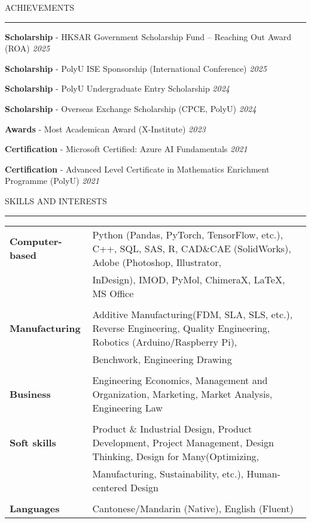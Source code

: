 \documentclass{resume} %
\renewenvironment{rSection}[1]{
\sectionskip
\textcolor{TsinghuaPurple}{\MakeUppercase{#1}}
\sectionlineskip
\hrule
\begin{list}{}{
\setlength{\leftmargin}{0em}
}
\item[]
}{
\end{list}
}
\begin{document}
\begin{rSection}{Achievements}
{\textbf{Scholarship} - HKSAR Government Scholarship Fund -- Reaching Out Award (ROA)} \hfill \textit{2025}

{\textbf{Scholarship} - PolyU ISE Sponsorship (International Conference)} \hfill \textit{2025}

{\textbf{Scholarship} - PolyU Undergraduate Entry Scholarship} \hfill \textit{2024}

{\textbf{Scholarship} - Overseas Exchange Scholarship (CPCE, PolyU)} \hfill \textit{2024}

{\textbf{Awards} - Most Academican Award (X-Institute)} \hfill \textit{2023}

{\textbf{Certification} - Microsoft Certified: Azure AI Fundamentals} \hfill \textit{2021}

{\textbf{Certification} - Advanced Level Certificate in Mathematics Enrichment Programme (PolyU)} \hfill \textit{2021}
\end{rSection}


\begin{rSection}{skills and INTERESTS}

\begin{tabular}{ @{} >{\bfseries}l @{\hspace{6ex}} l }  
Computer-based  & Python (Pandas, PyTorch, TensorFlow, etc.), C++, SQL, SAS, R, CAD\&CAE (SolidWorks), Adobe (Photoshop, Illustrator,\\
                & InDesign), IMOD, PyMol, ChimeraX, LaTeX, MS Office\\
\\
Manufacturing   & Additive Manufacturing(FDM, SLA, SLS, etc.), Reverse Engineering, Quality Engineering, Robotics (Arduino/Raspberry Pi),\\ 
                &  Benchwork, Engineering Drawing\\
\\
Business        & Engineering Economics, Management and Organization, Marketing, Market Analysis, Engineering Law\\
\\
Soft skills     & Product \& Industrial Design, Product Development, Project Management, Design Thinking, Design for Many(Optimizing,\\ 
                & Manufacturing, Sustainability, etc.), Human-centered Design\\
\\
Languages       & Cantonese/Mandarin (Native), English (Fluent)\\

\end{tabular}   

\end{rSection}
\end{document}
